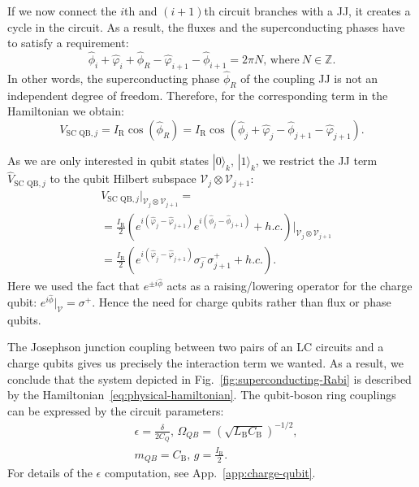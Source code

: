 \documentclass[reprint, aps, prx, amsmath, amssymb, longbibliography, superscriptaddress]{revtex4-2}
\begin{document}
If we now connect the $i$th and $(i+1)$th circuit branches with a JJ, it creates a cycle in the circuit. As a result, the fluxes and the superconducting phases have to satisfy a requirement:
\begin{equation}
  \hat \phi_i + \hat\varphi_i + \hat\phi_R - \hat\varphi_{i+1} - \hat\phi_{i+1} = 2\pi N, \, \text{where}\ N \in \mathbb{Z}.
\end{equation}
In other words, the superconducting phase $\hat \phi_R$ of the coupling JJ is not an independent degree of freedom. Therefore, for the corresponding term in the Hamiltonian we obtain:
\begin{equation}
    V_{\text{SC QB},j} = I_{\text{R}} \cos(\hat \phi_R) =  I_{\text{R}}\cos(\hat \phi_j + \hat \varphi_j - \hat \phi_{j+1} - \hat \varphi_{j+1}).
\end{equation}


As we are only interested in qubit states $|0\rangle_k,\, |1\rangle_k$, we restrict the JJ term $\hat V_{\text{SC QB},j}$ to the qubit Hilbert subspace $\mathcal{V}_j\otimes \mathcal{V}_{j+1}$:
\begin{equation}
\begin{aligned}
    &V_{\text{SC QB},j} \bigg |_{\mathcal{V}_j\otimes \mathcal{V}_{j+1}} = \\
    &=\frac{I_{\text{R}}}{2}\left(e^{i(\hat\varphi_j - \hat\varphi_{j+1})} e^{i(\hat\phi_j - \hat\phi_{j+1})} + h.c. \right) \bigg|_{\mathcal{V}_j\otimes \mathcal{V}_{j+1}} \\
    &=\frac{I_{\text{R}}}{2}\left(e^{i(\hat\varphi_j - \hat\varphi_{j+1})} \sigma_j^- \sigma_{j+1}^+ + h.c. \right).
\end{aligned}
\end{equation}
Here we used the fact that $e^{\pm i\hat\phi}$ acts as a raising/lowering operator for the charge qubit: $e^{i\hat\phi}|_{\mathcal{V}} = \sigma^+$. Hence the need for charge qubits rather than flux or phase qubits.

The Josephson junction coupling between two pairs of an LC circuits and a charge qubits gives us precisely the interaction term we wanted. As a result, we conclude that the system depicted in Fig.~\ref{fig:superconducting-Rabi} is described by the Hamiltonian~\eqref{eq:physical-hamiltonian}.  The qubit-boson ring couplings can be expressed by the circuit parameters:
\begin{equation}
\begin{aligned}
    &\epsilon = \frac{\delta}{2 C_Q},\,
    \Omega_{QB} = \left(\sqrt{L_{\text{B}}C_{\text{B}}}\right)^{-1/2}, \\
    &m_{QB} = C_{\text{B}}, \, g = \frac{I_{\text{R}}}{2}.
\end{aligned}
\end{equation}
For details of the $\epsilon$ computation, see App.~\ref{app:charge-qubit}. 
\end{document}
